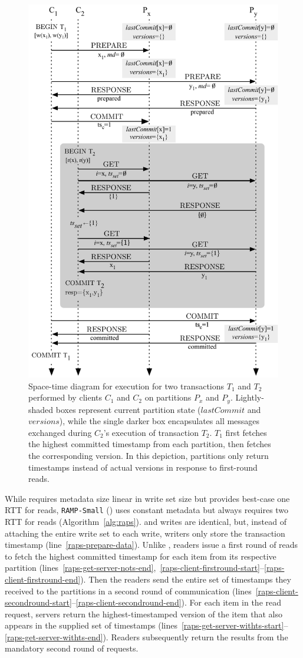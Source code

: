 \begin{figure}[t!]
\begin{center}
\includegraphics[width=.6\columnwidth]{diagram/raps-big.pdf}\vspace{.5em}
\caption{Space-time diagram for \raps execution for two transactions
  $T_1$ and $T_2$ performed by clients $C_1$ and $C_2$ on partitions
  $P_x$ and $P_y$. Lightly-shaded boxes represent current partition
  state ($lastCommit$ and $versions$), while the single darker box
  encapsulates all messages exchanged during $C_2$'s execution of
  transaction $T_2$. $T_1$ first fetches the highest committed
  timestamp from each partition, then fetches the corresponding
  version. In this depiction, partitions only return timestamps
  instead of actual versions in response to first-round reads.}
\label{fig:raps-execution}
\end{center}
\end{figure}

While \rapl requires metadata size linear in write set size but provides best-case
one RTT for reads, \texttt{RAMP-Small} (\raps) uses constant
metadata but always requires two RTT for reads
(Algorithm~\ref{alg:raps}). \raps and \rapl writes are identical, but,
instead of attaching the entire write set to each write, \raps writers
only store the transaction timestamp
(line~\ref{raps-prepare-data}). Unlike \rapl, \raps readers issue a
first round of reads to fetch the highest committed timestamp for each
item from its respective partition
(lines~\ref{raps-get-server-nots-end},~\ref{raps-client-firstround-start}--\ref{raps-client-firstround-end}). Then
the readers send the entire set of timestamps they received to
the partitions in a second round of communication
(lines~\ref{raps-client-secondround-start}--\ref{raps-client-secondround-end}). For
each item in the read request, \raps servers return the
highest-timestamped version of the item that also appears in the
supplied set of timestamps
(lines~\ref{raps-get-server-withts-start}--\ref{raps-get-server-withts-end}). Readers
subsequently return the results from the mandatory second round of
requests.

